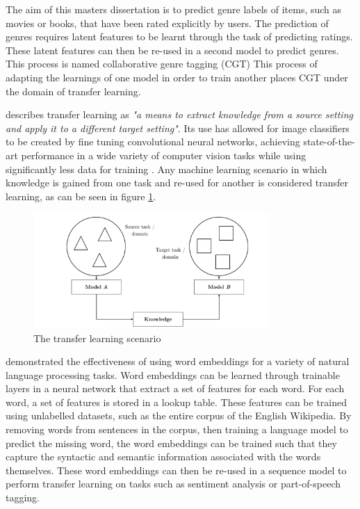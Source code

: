 The aim of this masters dissertation is to predict genre labels of items, such as movies or books, that have been rated explicitly by users. The prediction of genres requires latent features to be learnt through the task of predicting ratings. These latent features can then be re-used in a second model to predict genres. This process is named collaborative genre tagging (CGT) This process of adapting the learnings of one model in order to train another places CGT under the domain of transfer learning.

\cite{ruder2019state} describes transfer learning as \textit{"a means to extract knowledge from a source setting and apply it to a different target setting"}. Its use has allowed for image classifiers to be created by fine tuning convolutional neural networks, achieving state-of-the-art performance in a wide variety of computer vision tasks while using significantly less data for training \parencite{sharif2014cnn}. Any machine learning scenario in which knowledge is gained from one task and re-used for another is considered transfer learning, as can be seen in figure \ref{fig:transfer-scenario}.

\begin{figure}[H]
\centering
\includegraphics[width=0.8\textwidth]{Figures/2_transfer-learning-scenario.png}
\decoRule
\caption[Transfer Learning Scenario]{The transfer learning scenario \parencite{ruder2019state}}
\label{fig:transfer-scenario}
\end{figure}

\cite{collobert2011natural} demonstrated the effectiveness of using word embeddings for a variety of natural language processing tasks. Word embeddings can be learned through trainable layers in a neural network that extract a set of features for each word. For each word, a set of features is stored in a lookup table. These features can be trained using unlabelled datasets, such as the entire corpus of the English Wikipedia. By removing words from sentences in the corpus, then training a language model to predict the missing word, the word embeddings can be trained such that they capture the syntactic and semantic information associated with the words themselves. These word embeddings can then be re-used in a sequence model to perform transfer learning on tasks such as sentiment analysis or part-of-speech tagging.